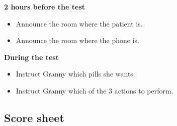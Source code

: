\textbf{2 hours before the test}
\begin{itemize}
	\item Announce the room where the patient is.
	\item Announce the room where the phone is.
\end{itemize}

\textbf{During the test}
\begin{itemize}
	\item Instruct Granny which pills she wants.
	\item Instruct Granny which of the 3 actions to perform.
\end{itemize}

\newpage 
\subsection{Score sheet}


